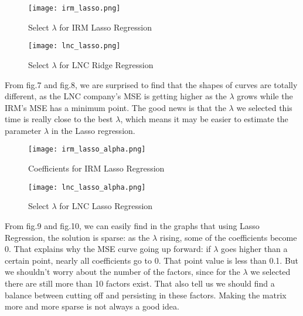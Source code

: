 \documentclass[fleqn,10pt]{SelfArx} %
\begin{document}
\begin{figure}[ht]\centering %
\texttt{[image: irm\_lasso.png]}
\caption{Select $\lambda$ for IRM Lasso Regression}
\label{fig:view}
\end{figure}

\begin{figure}[ht]\centering %
\texttt{[image: lnc\_lasso.png]}
\caption{Select $\lambda$ for LNC Ridge Regression}
\label{fig:view}
\end{figure}

\noindent
From fig.7 and fig.8, we are surprised to find that the shapes of curves are totally different, as the LNC company's MSE is getting higher as the $\lambda$ grows while the IRM's MSE has a minimum point. The good news is that the $\lambda$ we selected this time is really close to the best $\lambda$, which means it may be easier to estimate the parameter $\lambda$ in the Lasso regression.\\

\begin{figure}[ht]\centering %
\texttt{[image: irm\_lasso\_alpha.png]}
\caption{Coefficients for IRM Lasso Regression}
\label{fig:view}
\end{figure}

\begin{figure}[htb]\centering %
\texttt{[image: lnc\_lasso\_alpha.png]}
\caption{Select $\lambda$ for LNC Lasso Regression}
\label{fig:view}
\end{figure}

\noindent
From fig.9 and fig.10, we can easily find in the graphs that using Lasso Regression, the solution is sparse: as the $\lambda$ rising, some of the coefficients become 0. That explains why the MSE curve going up forward: if $\lambda$ goes higher than a certain point, nearly all coefficients go to 0. That point value is less than 0.1. But we shouldn't worry about the number of the factors, since for the $\lambda$ we selected there are still more than 10 factors exist. That also tell us we should find a balance between cutting off and persisting in these factors. Making the matrix more and more sparse is not always a good idea.
\end{document}
